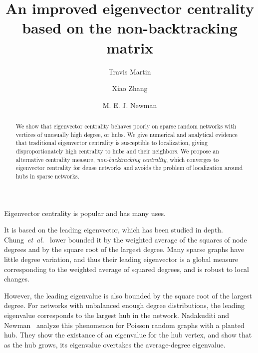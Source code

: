 \documentclass[twocolumn,prl,superscriptaddress]{revtex4}
\newcommand{\etal}{{\it{}et~al.}}
\begin{document}
\title{An improved eigenvector centrality based on the non-backtracking matrix}
\author{Travis Martin}
\author{Xiao Zhang}
\author{M. E. J. Newman}

\begin{abstract}
  We show that eigenvector centrality behaves poorly on sparse random networks with vertices of unusually high degree, or hubs. We give numerical and analytical evidence that traditional eigenvector centrality is susceptible to localization, giving disproportionately high centrality to hubs and their neighbors. We propose an alternative centrality measure, \emph{non-backtracking centrality}, which converges to eigenvector centrality for dense networks and avoids the problem of localization around hubs in sparse networks.
\end{abstract}

\maketitle

Eigenvector centrality is popular and has many uses.

It is based on the leading eigenvector, which has been studied in depth. Chung~\etal~\cite{chung03} lower bounded it by the weighted average of the squares of node degrees and by the square root of the largest degree. Many sparse graphs have little degree variation, and thus their leading eigenvector is a global measure corresponding to the weighted average of squared degrees, and is robust to local changes.

However, the leading eigenvalue is also bounded by the square root of the largest degree. For networks with unbalanced enough degree distributions, the leading eigenvalue corresponds to the largest hub in the network. Nadakuditi and Newman~\cite{nadakuditi13} analyze this phenomenon for Poisson random graphs with a planted hub. They show the existance of an eigenvalue for the hub vertex, and show that as the hub grows, its eigenvalue overtakes the average-degree eigenvalue.
\end{document}
